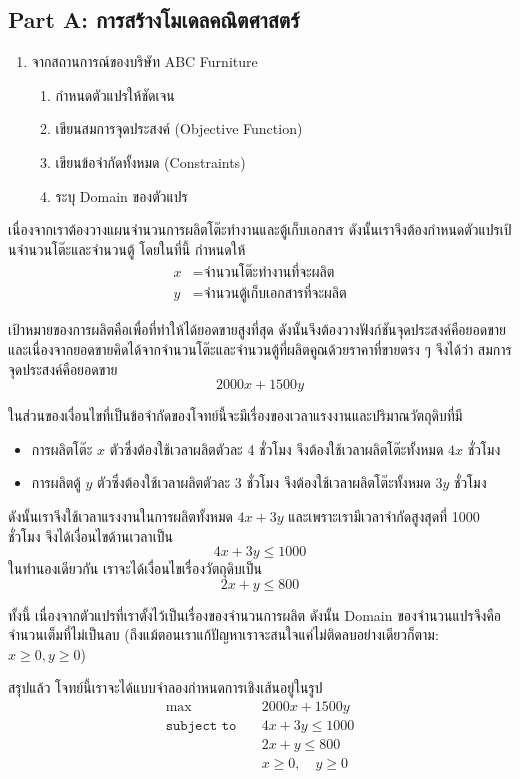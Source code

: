 \subsection*{Part A: การสร้างโมเดลคณิตศาสตร์}
\begin{enumerate}
    \item จากสถานการณ์ของบริษัท ABC Furniture
        \begin{enumerate}
            \item กำหนดตัวแปรให้ชัดเจน
            \item เขียนสมการจุดประสงค์ (Objective Function)
            \item เขียนข้อจำกัดทั้งหมด (Constraints)
            \item ระบุ Domain ของตัวแปร
        \end{enumerate}
\end{enumerate}
\begin{solution}
    เนื่องจากเราต้องวางแผนจำนวนการผลิตโต๊ะทำงานและตู้เก็บเอกสาร ดังนั้นเราจึงต้องกำหนดตัวแปรเป้นจำนวนโต๊ะและจำนวนตู้ โดยในที่นี้ กำหนดให้
    \begin{align*}
        x &= \text{จำนวนโต๊ะทำงานที่จะผลิต}\\
        y &= \text{จำนวนตู้เก็บเอกสารที่จะผลิต}
    \end{align*}

    เป้าหมายของการผลิตคือเพื่อที่ทำให้ได้ยอดขายสูงที่สุด ดังนั้นจึงต้องวางฟังก์ชันจุดประสงค์คือยอดขาย และเนื่องจากยอดขายคิดได้จากจำนวนโต๊ะและจำนวนตู้ที่ผลิตคูณด้วยราคาที่ขายตรง ๆ จึงได้ว่า สมการจุดประสงค์คือยอดขาย
    $$
    2000x + 1500y
    $$

    ในส่วนของเงื่อนไขที่เป็นข้อจำกัดของโจทย์นี้จะมีเรื่องของเวลาแรงงานและปริมาณวัตถุดิบที่มี
    \begin{itemize}
        \item การผลิตโต๊ะ $x$ ตัวซึ่งต้องใช้เวลาผลิตตัวละ 4 ชั่วโมง จึงต้องใช้เวลาผลิตโต๊ะทั้งหมด $4x$ ชั่วโมง
        \item การผลิตตู้ $y$ ตัวซึ่งต้องใช้เวลาผลิตตัวละ 3 ชั่วโมง จึงต้องใช้เวลาผลิตโต๊ะทั้งหมด $3y$ ชั่วโมง
    \end{itemize}
    ดังนั้นเราจึงใช้เวลาแรงงานในการผลิตทั้งหมด $4x + 3y$ และเพราะเรามีเวลาจำกัดสูงสุดที่ 1000 ชั่วโมง จึงได้เงื่อนไขด้านเวลาเป็น
    $$
    4x + 3y \leq 1000
    $$
    ในทำนองเดียวกัน เราจะได้เงื่อนไขเรื่องวัตถุดิบเป็น
    $$
    2x + y \leq 800
    $$

    ทั้งนี้ เนื่องจากตัวแปรที่เราตั้งไว้เป็นเรื่องของจำนวนการผลิต ดังนั้น Domain ของจำนวนแปรจึงคือจำนวนเต็มที่ไม่เป็นลบ (ถึงแม้ตอนเราแก้ปัญหาเราจะสนใจแค่ไม่ติดลบอย่างเดียวก็ตาม: $x \geq 0, y\geq 0$)

    สรุปแล้ว โจทย์นี้เราจะได้แบบจำลองกำหนดการเชิงเส้นอยู่ในรูป
        \begin{align*}
            \max \quad & 2000x + 1500y \\
            \texttt{subject to} \quad
            & 4x + 3y \leq 1000 \\
            & 2x + y \leq 800 \\
            & x \geq 0, \quad y \geq 0 
        \end{align*}
\end{solution}

